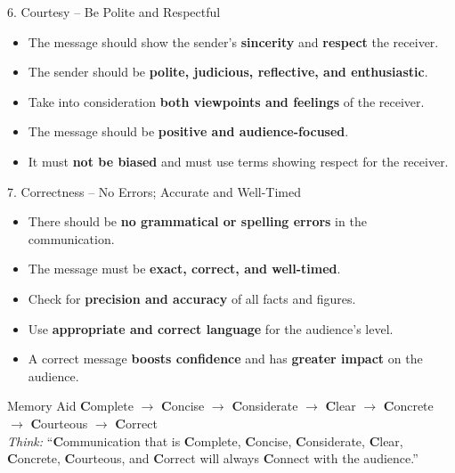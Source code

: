 \documentclass[12pt,a4paper]{article}
\begin{document}
\begin{keybox}{6. Courtesy -- Be Polite and Respectful}
\begin{itemize}[noitemsep]
    \item The message should show the sender's \textbf{sincerity} and \textbf{respect} the receiver.
    \item The sender should be \textbf{polite, judicious, reflective, and enthusiastic}.
    \item Take into consideration \textbf{both viewpoints and feelings} of the receiver.
    \item The message should be \textbf{positive and audience-focused}.
    \item It must \textbf{not be biased} and must use terms showing respect for the receiver.
\end{itemize}
\end{keybox}

\begin{keybox}{7. Correctness -- No Errors; Accurate and Well-Timed}
\begin{itemize}[noitemsep]
    \item There should be \textbf{no grammatical or spelling errors} in the communication.
    \item The message must be \textbf{exact, correct, and well-timed}.
    \item Check for \textbf{precision and accuracy} of all facts and figures.
    \item Use \textbf{appropriate and correct language} for the audience's level.
    \item A correct message \textbf{boosts confidence} and has \textbf{greater impact} on the audience.
\end{itemize}
\end{keybox}

\begin{tipbox}{Memory Aid}
\textbf{C}omplete $\rightarrow$ \textbf{C}oncise $\rightarrow$ \textbf{C}onsiderate $\rightarrow$ \textbf{C}lear $\rightarrow$  \textbf{C}oncrete $\rightarrow$ \textbf{C}ourteous $\rightarrow$ \textbf{C}orrect\\[0.2cm]
\textit{Think:} ``\textbf{C}ommunication that is \textbf{C}omplete, \textbf{C}oncise, \textbf{C}onsiderate, \textbf{C}lear, \textbf{C}oncrete, \textbf{C}ourteous, and \textbf{C}orrect will always \textbf{C}onnect with the audience.''
\end{tipbox}

\newpage
\end{document}
